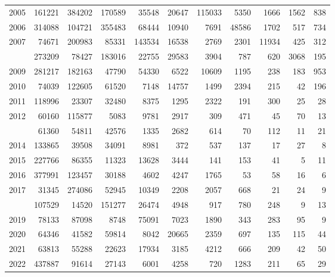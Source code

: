 \documentclass[
]{article}
\begin{document}
\begin{longtable}[t]{lrrrrrrrrrr}
2005 & 161221 & 384202 & 170589 & 35548 & 20647 & 115033 & 5350 & 1666 & 1562 & 838\\
2006 & 314088 & 104721 & 355483 & 68444 & 10940 & 7691 & 48586 & 1702 & 517 & 734\\
2007 & 74671 & 200983 & 85331 & 143534 & 16538 & 2769 & 2301 & 11934 & 425 & 312\\
\addlinespace
2008 & 273209 & 78427 & 183016 & 22755 & 29583 & 3904 & 787 & 620 & 3068 & 195\\
2009 & 281217 & 182163 & 47790 & 54330 & 6522 & 10609 & 1195 & 238 & 183 & 953\\
2010 & 74039 & 122605 & 61520 & 7148 & 14757 & 1499 & 2394 & 215 & 42 & 196\\
2011 & 118996 & 23307 & 32480 & 8375 & 1295 & 2322 & 191 & 300 & 25 & 28\\
2012 & 60160 & 115877 & 5083 & 9781 & 2917 & 309 & 471 & 45 & 70 & 13\\
\addlinespace
2013 & 61360 & 54811 & 42576 & 1335 & 2682 & 614 & 70 & 112 & 11 & 21\\
2014 & 133865 & 39508 & 34091 & 8981 & 372 & 537 & 137 & 17 & 27 & 8\\
2015 & 227766 & 86355 & 11323 & 13628 & 3444 & 141 & 153 & 41 & 5 & 11\\
2016 & 377991 & 123457 & 30188 & 4602 & 4247 & 1765 & 53 & 58 & 16 & 6\\
2017 & 31345 & 274086 & 52945 & 10349 & 2208 & 2057 & 668 & 21 & 24 & 9\\
\addlinespace
2018 & 107529 & 14520 & 151277 & 26474 & 4948 & 917 & 780 & 248 & 9 & 13\\
2019 & 78133 & 87098 & 8748 & 75091 & 7023 & 1890 & 343 & 283 & 95 & 9\\
2020 & 64346 & 41582 & 59814 & 8042 & 20665 & 2359 & 697 & 135 & 115 & 44\\
2021 & 63813 & 55288 & 22623 & 17934 & 3185 & 4212 & 666 & 209 & 42 & 50\\
2022 & 437887 & 91614 & 27143 & 6001 & 4258 & 720 & 1283 & 211 & 65 & 29\\*
\end{longtable}
\end{document}

